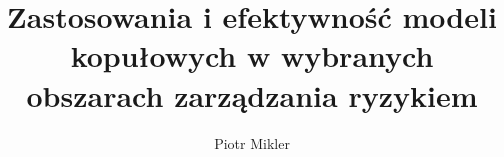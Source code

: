 \documentclass[mf, pdftex]{mgrwms}
\begin{document}
\title{\LARGE Zastosowania i efektywność modeli kopułowych w wybranych obszarach zarządzania ryzykiem}
\author{Piotr Mikler}
\maketitle
{}

\newtheorem{thm}{\indent Twierdzenie}[chapter]
\newtheorem{lemma}[thm]{\indent Lemat}
\newtheorem{cor}[thm]{\indent Wniosek}
\newtheorem{obs}[thm]{\indent Obserwacja}
\newtheorem{prop}[thm]{\indent Własność}
\newtheorem{uw}[thm]{\indent Uwaga}
\newtheorem{df}[thm]{Definicja}
\newcommand{\E}{\mathbb{E}}
\newcommand{\R}{\mathbb{R}}
\newcommand{\Pra}{\mathbb{P}}
\newcommand{\1}{\mathbbm{1}}
\newcommand{\Corr}{\text{Cor}}
\newcommand{\Cov}{\text{Cov}}
\newcommand{\Var}{\text{Var}}
\newcommand{\Nu}{\mathcal{V}}

\makeatletter
\newcommand*{\defeq}{\mathrel{\rlap{%
                     \raisebox{0.3ex}{$\m@th\cdot$}}%
                     \raisebox{-0.3ex}{$\m@th\cdot$}}%
                     =}
\let\c@table\c@figure
\makeatother



\tableofcontents









%
 
\end{document}

